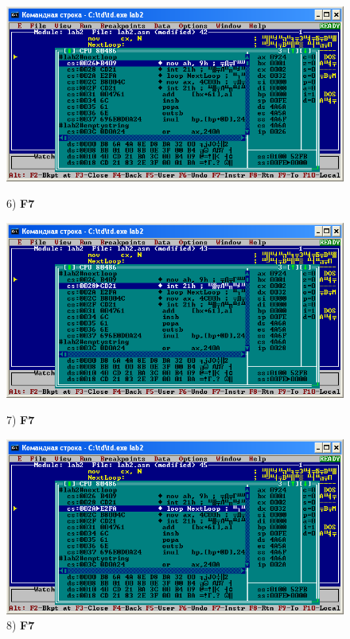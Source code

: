 \begin{figure}[!htp]
    \centering
    \begin{minipage}{0.32\textwidth}
        \centering
        \includegraphics[width=.99\linewidth]
            {../_INCLUDES/task-4-9/6.png}
        \caption{6) \textbf{F7}}
        \label{fig:task_4_9}
    \end{minipage}
    \begin {minipage}{0.32\textwidth}
        \centering
        \includegraphics[width=.99\linewidth]
            {../_INCLUDES/task-4-9/7.png}
        \caption{7) \textbf{F7}}
        \label{fig:task_4_9}
    \end{minipage}
    \begin {minipage}{0.32\textwidth}
        \centering
        \includegraphics[width=.99\linewidth]
            {../_INCLUDES/task-4-9/8.png}
        \caption{8) \textbf{F7}}
        \label{fig:task_4_9}
    \end{minipage}
\end{figure}

